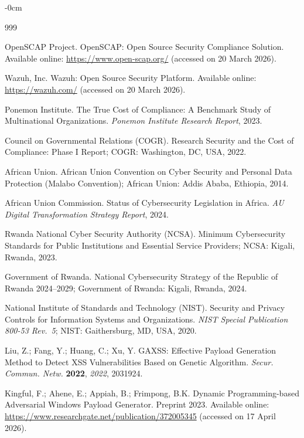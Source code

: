 \documentclass[futureinternet,article,submit,pdftex,moreauthors]{Definitions/mdpi}
\begin{document}
\begin{adjustwidth}{-\extralength}{0cm}


\begin{thebibliography}{999}

OpenSCAP Project. OpenSCAP: Open Source Security Compliance Solution. Available online:
\url{https://www.open-scap.org/} (accessed on 20 March 2026).

Wazuh, Inc. Wazuh: Open Source Security Platform. Available online:
\url{https://wazuh.com/} (accessed on 20 March 2026).

Ponemon Institute. The True Cost of Compliance: A Benchmark Study of Multinational
Organizations. \textit{Ponemon Institute Research Report}, 2023.

Council on Governmental Relations (COGR). Research Security and the Cost of Compliance:
Phase I Report; COGR: Washington, DC, USA, 2022.

African Union. African Union Convention on Cyber Security and Personal Data Protection
(Malabo Convention); African Union: Addis Ababa, Ethiopia, 2014.

African Union Commission. Status of Cybersecurity Legislation in Africa.
\textit{AU Digital Transformation Strategy Report}, 2024.

Rwanda National Cyber Security Authority (NCSA). Minimum Cybersecurity Standards for Public
Institutions and Essential Service Providers; NCSA: Kigali, Rwanda, 2023.

Government of Rwanda. National Cybersecurity Strategy of the Republic of Rwanda 2024--2029;
Government of Rwanda: Kigali, Rwanda, 2024.

National Institute of Standards and Technology (NIST). Security and Privacy Controls for
Information Systems and Organizations. \textit{NIST Special Publication 800-53 Rev.\ 5};
NIST: Gaithersburg, MD, USA, 2020.

Liu, Z.; Fang, Y.; Huang, C.; Xu, Y. GAXSS: Effective Payload Generation Method to Detect
XSS Vulnerabilities Based on Genetic Algorithm.
\textit{Secur. Commun. Netw.} \textbf{2022}, \textit{2022}, 2031924.

Kingful, F.; Ahene, E.; Appiah, B.; Frimpong, B.K. Dynamic Programming-based Adversarial
Windows Payload Generator. Preprint 2023. Available online:
\url{https://www.researchgate.net/publication/372005345} (accessed on 17 April 2026).


\end{thebibliography}
\end{adjustwidth}
\end{document}

